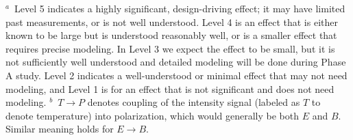 \begin{table}[h!]
{\begin{tabular}{@{}p{4.5cm} @{}c p{1.5cm} @{~}c@{} p{0.5cm} @{}p{3.0cm} @{}c p{1.5cm} @{~}c@{}}
\cline{1-4}
\cline{6-9}
\end{tabular}
\vskip 3pt
} %
 \noindent
 \footnotesize
 {$^{a}$}~Level 5 indicates a highly significant, design-driving effect; it may have limited past measurements, or is not well understood.  Level 4 is an effect that is either known to be large but is understood reasonably well, or is a smaller effect that requires precise modeling.  In Level 3 we expect the effect to be small, but it is not sufficiently well understood and detailed modeling will be done during Phase A study. Level 2 indicates a well-understood or minimal effect that may not need modeling, and Level 1 is for an effect that is not significant and  does not need modeling.\qquad
 {$^{b}$}~$T \rightarrow P $ denotes coupling of the intensity signal (labeled as $T$ to denote temperature) into polarization, which would generally be both $E$ and $B$. Similar meaning holds for $E \rightarrow B$.\par
\end{table}



